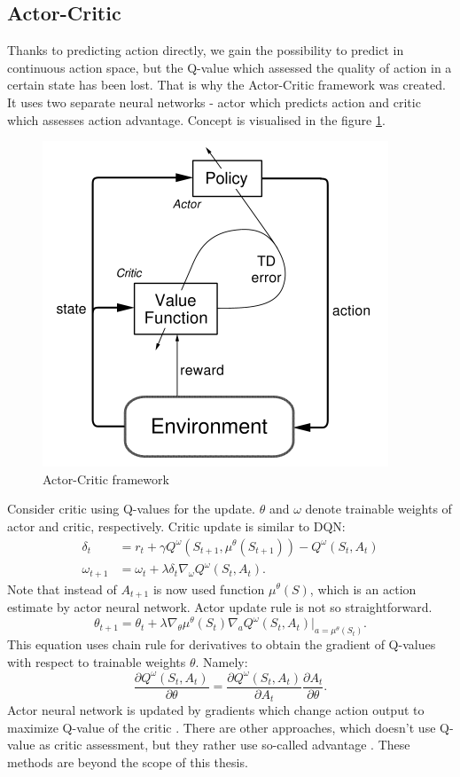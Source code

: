 \subsection{Actor-Critic}
Thanks to predicting action directly, we gain the possibility to predict in continuous action space, but the Q-value which assessed the quality of action in a certain state has been lost. That is why the Actor-Critic framework was created. It uses two separate neural networks - actor which predicts action and critic which assesses action advantage. Concept is visualised in the figure \ref{fig:actorcritic}.
\begin{figure}[H]
\centering
\includegraphics[scale=0.55]{fig/actor-critic.png}
\caption{Actor-Critic framework}
\label{fig:actorcritic}
\end{figure}
\clearpage

Consider critic using Q-values for the update. $\theta$ and $\omega$ denote trainable weights of actor and critic, respectively. Critic update is similar to DQN:
\begin{align}
\delta_t &= r_t + \gamma Q^\omega(S_{t+1}, \mu ^\theta (S_{t+1})) - Q^\omega(S_t, A_t)\\
\omega_{t+1} &= \omega_t + \lambda \delta_t \nabla_\omega Q^\omega(S_t, A_t).
\end{align}
Note that instead of $A_{t+1}$ is now used function $\mu^\theta(S)$, which is an action estimate by actor neural network. Actor update rule is not so straightforward. 
\begin{equation}
\theta_{t+1} = \theta_t + \lambda\nabla_\theta \mu^\theta(S_t)\nabla_a Q^\omega (S_t, A_t)|_{a = \mu^\theta(S_t)}.
\end{equation}
This equation uses chain rule for derivatives to obtain the gradient of Q-values with respect to trainable weights $\theta$. Namely:
\begin{equation}
\frac{\partial Q^\omega(S_t, A_t)}{\partial \theta} = \frac{\partial Q^\omega(S_t, A_t)}{\partial A_t} \frac{\partial A_t}{\partial \theta}.
\end{equation}
Actor neural network is updated by gradients which change action output to maximize Q-value of the critic \cite{silver2014}.
There are other approaches, which doesn't use Q-value as critic assessment, but they rather use so-called advantage \cite{schulman2017}. These methods are beyond the scope of this thesis. 


